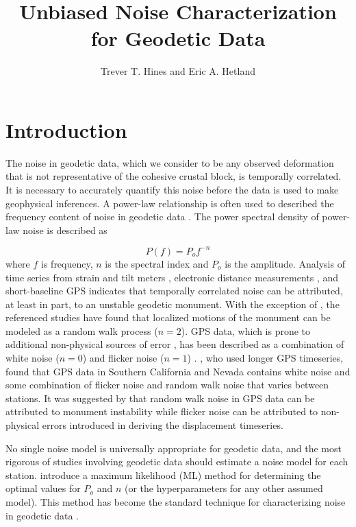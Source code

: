 \documentclass[10pt,a4paper]{article}
\title{Unbiased Noise Characterization for Geodetic Data}
\author{Trever T. Hines and Eric A. Hetland}
\begin{document}
\maketitle
\section{Introduction}\label{sec:Introduction}


The noise in geodetic data, which we consider to be any observed deformation that is not representative of the cohesive crustal block, is temporally correlated. It is necessary to accurately quantify this noise before the data is used to make geophysical inferences. A power-law relationship is often used to described the frequency content of noise in geodetic data \citep{Agnew1992}.  The power spectral density of power-law noise is described as 

\begin{equation}\label{eq.PowerLaw}
  P(f) = P_o f^{-n}
\end{equation}
where $f$ is frequency, $n$ is the spectral index and $P_o$ is the amplitude. Analysis of time series from strain and tilt meters \citep{Wyatt1982,Wyatt1989}, electronic distance measurements \citep{Langbein1997}, and short-baseline GPS \citep{King2009} indicates that temporally correlated noise can be attributed, at least in part, to an unstable geodetic monument. With the exception of \citet{King2009}, the referenced studies have found that localized motions of the monument can be modeled as a random walk process ($n=2$). GPS data, which is prone to additional non-physical sources of error \citep[e.g.][]{King2010}, has been described as a combination of white noise ($n=0$) and flicker noise ($n=1$) \citep{Zhang1997,Mao1999,Williams2004}. \citet{Langbein2008}, who used longer GPS timeseries,  found that GPS data in Southern California and Nevada contains white noise and some combination of flicker noise and random walk noise that varies between stations. It was suggested by \citet{Langbein2008} that random walk noise in GPS data can be attributed to monument instability while flicker noise can be attributed to non-physical errors introduced in deriving the displacement timeseries.  

No single noise model is universally appropriate for geodetic data, and the most rigorous of studies involving geodetic data should estimate a noise model for each station.  \citet{Langbein1997} introduce a maximum likelihood (ML) method for determining the optimal values for $P_o$ and $n$ (or the hyperparameters for any other assumed model). This method has become the standard technique for characterizing noise in geodetic data \citep{Langbein2004,Langbein2008,Zhang1997,Mao1999,Williams2004,King2009,Murray2017}.  
\end{document}

